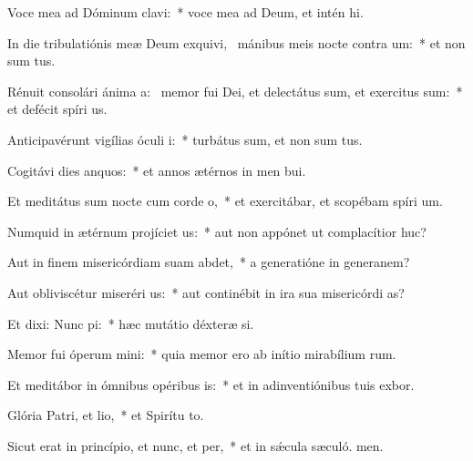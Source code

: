 \item Voce mea ad Dóminum clavi:~* voce mea ad Deum, et intén hi.
\item In die tribulatiónis meæ Deum exquivi,~\pscross{} mánibus meis nocte contra um:~* et non sum tus.
\item Rénuit consolári ánima a:~\pscross{} memor fui Dei, et delectátus sum, et exercitus sum:~* et defécit spíri us.
\item Anticipavérunt vigílias óculi i:~* turbátus sum, et non sum tus.
\item Cogitávi dies anquos:~* et annos ætérnos in men bui.
\item Et meditátus sum nocte cum corde o,~* et exercitábar, et scopébam spíri um.
\item Numquid in ætérnum projíciet us:~* aut non appónet ut complacítior  huc?
\item Aut in finem misericórdiam suam abdet,~* a generatióne in generanem?
\item Aut obliviscétur miseréri us:~* aut continébit in ira sua misericórdi as?
\item Et dixi: Nunc pi:~* hæc mutátio déxteræ si.
\item Memor fui óperum mini:~* quia memor ero ab inítio mirabílium rum.
\item Et meditábor in ómnibus opéribus is:~* et in adinventiónibus tuis exbor.
\item Glória Patri, et lio,~* et Spirítu to.
\item Sicut erat in princípio, et nunc, et per,~* et in sǽcula sæculó. men.
